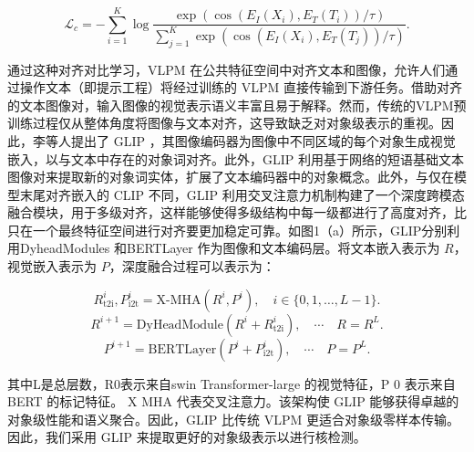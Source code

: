 \begin{equation}
\label{eq:contrastive}
\mathcal{L}_c=-\sum_{i=1}^K \log \frac{\exp \left(\cos \left(E_I\left(X_i\right), E_T\left(T_i\right)\right) / \tau\right)}{\sum_{j=1}^K \exp \left(\cos \left(E_I\left(X_i\right), E_T\left(T_j\right)\right) / \tau\right)}.
\end{equation}

通过这种对齐对比学习，VLPM 在公共特征空间中对齐文本和图像，允许人们通过操作文本（即提示工程）将经过训练的 VLPM 直接传输到下游任务。借助对齐的文本图像对，输入图像的视觉表示语义丰富且易于解释。然而，传统的VLPM预训练过程仅从整体角度将图像与文本对齐，这导致缺乏对对象级表示的重视。因此，李等人提出了 GLIP \cite{li2022grounded}，其图像编码器为图像中不同区域的每个对象生成视觉嵌入，以与文本中存在的对象词对齐。此外，GLIP 利用基于网络的短语基础文本图像对来提取新的对象词实体，扩展了文本编码器中的对象概念。此外，与仅在模型末尾对齐嵌入的 CLIP 不同，GLIP 利用交叉注意力机制构建了一个深度跨模态融合模块\cite{chen2021crossvit}，用于多级对齐，这样能够使得多级结构中每一级都进行了高度对齐，比只在一个最终特征空间进行对齐要更加稳定可靠。如图1（a）所示，GLIP分别利用DyheadModules \cite{dai2021dynamic}和BERTLayer \cite{devlin2018bert}作为图像和文本编码层。将文本嵌入表示为 $R$，视觉嵌入表示为 $P$，深度融合过程可以表示为：

\begin{equation}
\label{eq:glip_xmha}
R_{\mathrm{t}2\mathrm{i}}^{i}, P_{\mathrm{i}2\mathrm{t}}^{i}=\mathrm{X\text{-}MHA}\left(R^{i}, P^{i}\right),\quad i \in\{0,1, \ldots, L-1\}.
\end{equation}
\begin{equation}
\label{eq:glip_dyhead}
R^{i+1}=\mathrm{DyHeadModule}\left(R^{i}+R_{\mathrm{t}2\mathrm{i}}^{i}\right),\quad \cdots\quad R=R^{L}.
\end{equation}
\begin{equation}
\label{eq:glip_bert}
P^{i+1}=\mathrm{BERTLayer}\left(P^{i}+P_{\mathrm{i}2\mathrm{t}}^{i}\right),\quad \cdots\quad P=P^{L}.
\end{equation}

其中L是总层数，R0表示来自swin Transformer-large \cite{liu2021swin}的视觉特征，P 0 表示来自BERT \cite{devlin2018bert}的标记特征。 X MHA 代表交叉注意力。该架构使 GLIP 能够获得卓越的对象级性能和语义聚合。因此，GLIP 比传统 VLPM 更适合对象级零样本传输。因此，我们采用 GLIP 来提取更好的对象级表示以进行核检测。

